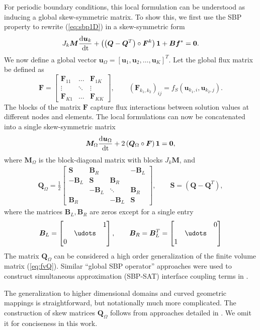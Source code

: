 \documentclass{article}
\newcommand{\td}[2]{\frac{{\rm d}#1}{{\rm d}{\rm #2}}}
\newcommand{\LRp}[1]{\left( #1 \right)}
\newcommand{\LRs}[1]{\left[ #1 \right]}
\newcommand{\eqlab}[1]{\begin{align}#1\end{align}}
\newcommand{\bmat}[1]{\begin{bmatrix}#1\end{bmatrix}}
\begin{document}
For periodic boundary conditions, this local formulation can be understood as inducing a global skew-symmetric matrix.  To show this, we first use the SBP property to rewrite (\ref{eq:sbp1D}) in a skew-symmetric form \cite{chan2019skew}
\eqlab{
J_k {\bm{M}} \td{\bm{u}_k}{t} + \LRp{\LRp{\bm{Q}-\bm{Q}^T} \circ \bm{F}^k}\bm{1} + \bm{B}\bm{f}^* = \bm{0}.
\label{eq:sbp1D}
}
We now define a global vector $\bm{u}_{\Omega} = \LRs{\bm{u}_1, \bm{u}_2, \ldots, \bm{u}_K}^T$.  Let the global flux matrix be defined as
\[
\bm{F} = \bmat{
\bm{F}_{11} & \ldots & \bm{F}_{1K}\\
\vdots & \ddots & \vdots\\
\bm{F}_{K1} & \ldots & \bm{F}_{KK}
}, \qquad \LRp{\bm{F}_{k_1,k_2}}_{ij} = f_S(\bm{u}_{k_1,i}, \bm{u}_{k_2,j}).
\]
The blocks of the matrix $\bm{F}$ capture flux interactions between solution values at different nodes and elements.  
The local formulations can now be concatenated into a single skew-symmetric matrix
\[
\bm{M}_{\Omega}\td{\bm{u}_{\Omega}}{t} + 2\LRp{\bm{Q}_{\Omega}\circ \bm{F}}\bm{1} = \bm{0},
\]
where $\bm{M}_{\Omega}$ is the block-diagonal matrix with blocks $J_k\bm{M}$, and 
\eqlab{
\bm{Q}_{\Omega} = \frac{1}{2}\bmat{
\bm{S} &\bm{B}_R & & -\bm{B}_L\\
-\bm{B}_L& \bm{S} & \bm{B}_R&\\
& -\bm{B}_L & \ddots & \bm{B}_R\\
\bm{B}_R& & -\bm{B}_L & \bm{S}
}, \qquad \bm{S} = \LRp{\bm{Q}-\bm{Q}^T},
\label{eq:sbpmat}
}
where the matrices $\bm{B}_L,\bm{B}_R$ are zeros except for a single entry
\[
\bm{B}_L = \bmat{
 & &1\\
& \udots & \\
0 & & 
}, \qquad \bm{B}_R = \bm{B}_L^T = \bmat{
 & & 0\\
& \udots & \\
1 & & 
}
\]
The matrix $\bm{Q}_{\Omega}$ can be considered a high order generalization of the finite volume matrix (\ref{eq:fvQ}).  Similar ``global SBP operator'' approaches were used to construct simultaneous approximation (SBP-SAT) interface coupling terms in \cite{crean2018entropy, chan2018efficient, fernandez2019entropy}.  

The generalization to higher dimensional domains and curved geometric mappings is straightforward, but notationally much more complicated.  The construction of skew matrices $\bm{Q}_{\Omega}$ follows from approaches detailed in \cite{crean2018entropy, chan2017discretely, chan2018discretely, chan2018efficient, chan2019skew, hicken2020entropy}.  We omit it for conciseness in this work.  
\end{document}
